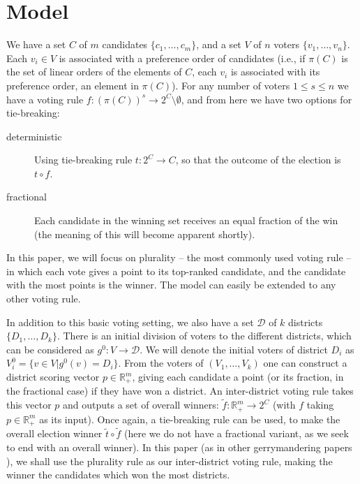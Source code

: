 \documentclass[letterpaper]{article} %
\begin{document}
\section{Model}

We have a set $C$ of $m$ candidates $\{c_{1},\ldots,c_{m}\}$, and a set $V$ of $n$ voters $\{v_{1},\ldots,v_{n}\}$. Each $v_{i}\in V$ is associated with a preference order of candidates (i.e., if $\pi(C)$ is the set of linear orders of the elements of $C$, each $v_{i}$ is associated with its preference order, an element in $\pi(C)$). For any number of voters $1\leq s\leq n$ we have a voting rule $f:(\pi(C))^{s}\rightarrow 2^{C} \setminus \emptyset$, and from here we have two options for tie-breaking:
\begin{description}
\item[deterministic] Using tie-breaking rule $t:2^{C}\rightarrow C$, so that the outcome of the election is $t\circ f$.
\item [fractional] Each candidate in the winning set receives an equal fraction of the win (the meaning of this will become apparent shortly).
\end{description}

In this paper, we will focus on plurality -- the most commonly used voting rule -- in which each vote gives a point to its top-ranked candidate, and the candidate with the most points is the winner. The model can easily be extended to any other voting rule.

In addition to this basic voting setting, we also have a set $\mathcal{D}$ of $k$ districts $\{D_{1},\ldots,D_{k}\}$. There is an initial division of voters to the different districts, which can be considered as $g^{0}:V\rightarrow \mathcal{D}$. We will denote the initial voters of district $D_{i}$ as $V^{0}_{i}=\{v\in V | g^{0}(v)=D_{i}\}$. From the voters of $(V_{1},\ldots, V_{k})$ one can construct a district scoring vector $p\in\mathbb{R}_{+}^{m}$, giving each candidate a point (or its fraction, in the fractional case) if they have won a district. An inter-district voting rule takes this vector $p$ and outputs a set of overall winners: $\tilde{f}:\mathbb{R}_{+}^{m}\rightarrow 2^{C}$ (with $f$ taking $p\in\mathbb{R}_{+}^{m}$ as its input). Once again, a tie-breaking rule can be used, to make the overall election winner $\tilde{t}\circ \tilde{f}$ (here we do not have a fractional variant, as we seek to end with an overall winner). In this paper (as in other gerrymandering papers \cite{BLLZ16,LLR17,BLSS18}), we shall use the plurality rule as our inter-district voting rule, making the winner the candidates which won the most districts.
\end{document}
